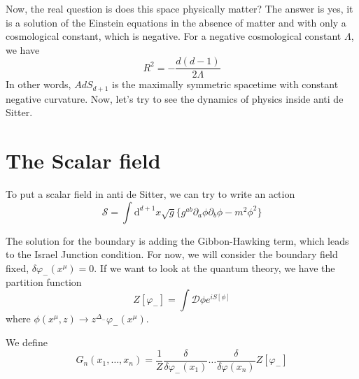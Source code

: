 \documentclass[a4paper]{book}
\theoremstyle{definition}
\theoremstyle{remark}
\begin{document}
Now, the real question is does this space physically matter? The answer is yes, it is a solution of the Einstein equations in the absence of matter and with only a cosmological constant, which is negative. For a negative cosmological constant $\Lambda$, we have 
\begin{equation}
    R^2 = -\frac{d(d-1)}{2\Lambda}
\end{equation} 
In other words, $AdS_{d+1}$ is the maximally symmetric spacetime with constant negative curvature. Now, let's try to see the dynamics of physics inside anti de Sitter. 

\section{The Scalar field}

To put a scalar field in anti de Sitter, we can try to write an action 
\begin{equation}
    \mathcal S = \int \text{d}^{d+1}x \sqrt{g} \{g^{ab} \partial_a \phi \partial_b \phi - m^2 \phi^2\} 
\end{equation}

The solution for the boundary is adding the Gibbon-Hawking term, which leads to the Israel Junction condition. For now, we will consider the boundary field fixed, $\delta \varphi_-(x^\mu) = 0$. If we want to look at the quantum theory, we have the partition function 
\begin{equation}
    Z[\varphi_-] = \int \mathcal D \phi e^{iS[\phi]}
\end{equation}
where $\phi(x^\mu, z) \rightarrow z^{\Delta_-} \varphi_-(x^\mu)$.\par \medskip  


We define 
\begin{equation}
    G_n(x_1, \dots, x_n) = \frac{1}{Z} \frac{\delta}{\delta \varphi_- (x_1)} \dots \frac{\delta}{\delta \varphi(x_n)} Z[\varphi_-]
\end{equation}
\end{document}

